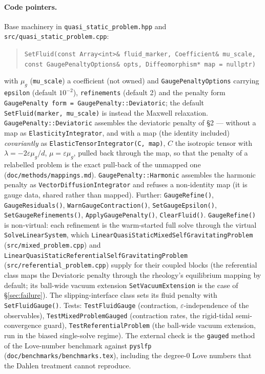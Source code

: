 \documentclass[11pt]{article}
\newcommand{\eps}{\varepsilon}
\begin{document}
\paragraph{Code pointers.}
Base machinery in \texttt{quasi\_static\_problem.hpp} and
\texttt{src/quasi\_static\_problem.cpp}:
\begin{quote}\small\raggedright
\texttt{SetFluid(const Array<int>\& fluid\_marker,
Coefficient\& mu\_scale, const GaugePenaltyOptions\& opts,
Diffeomorphism* map = nullptr)}
\end{quote}
with $\mu_g$ (\texttt{mu\_scale}) a coefficient (not owned) and
\texttt{GaugePenaltyOptions} carrying \texttt{epsilon} (default
$10^{-2}$), \texttt{refinements} (default 2) and the penalty form
\texttt{GaugePenalty form = GaugePenalty::Deviatoric}; the default
\texttt{SetFluid(marker, mu\_scale)} is instead the Maxwell relaxation. \texttt{GaugePenalty::Deviatoric}
assembles the deviatoric penalty of \S2 --- without a map as
\texttt{ElasticityIntegrator}, and with a map (the identity included)
\emph{covariantly} as \texttt{ElasticTensorIntegrator(C, map)}, $C$ the
isotropic tensor with $\lambda = -2\eps\mu_g/d$, $\mu = \eps\mu_g$, pulled
back through the map, so that the penalty of a relabelled problem is the
exact pull-back of the unmapped one (\texttt{doc/methods/mappings.md}).
\texttt{GaugePenalty::Harmonic} assembles the harmonic penalty as
\texttt{VectorDiffusionIntegrator} and refuses a non-identity map (it is
gauge data, shared rather than mapped). Further:
\texttt{GaugeRefine()}, \texttt{GaugeResiduals()},
\texttt{WarnGaugeContraction()}, \texttt{SetGaugeEpsilon()},
\texttt{SetGaugeRefinements()}, \texttt{ApplyGaugePenalty()},
\texttt{ClearFluid()}. \texttt{GaugeRefine()} is non-virtual: each
refinement is the warm-started full solve through the virtual
\texttt{SolveLinearSystem}, which
\texttt{LinearQuasiStaticMixedSelfGravitatingProblem}
(\texttt{src/mixed\_problem.cpp}) and
\texttt{LinearQuasiStaticReferentialSelfGravitatingProblem}
(\texttt{src/referential\_problem.cpp}) supply for their coupled blocks
(the referential class maps the Deviatoric penalty through the
rheology's equilibrium mapping by default; its ball-wide vacuum
extension \texttt{SetVacuumExtension} is the case of
\S\ref{sec:failure}). The slipping-interface class sets its
fluid penalty with \texttt{SetFluidGauge()}.
Tests: \texttt{TestFluidGauge} (contraction, $\eps$-independence of the
observables), \texttt{TestMixedProblemGauged} (contraction rates, the
rigid-tidal semi-convergence guard), \texttt{TestReferentialProblem}
(the ball-wide vacuum extension, run in the biased single-solve regime).
The external check is the \texttt{gauged} method of the Love-number
benchmark against \texttt{pyslfp} (\texttt{doc/benchmarks/benchmarks.tex}),
including the degree-0 Love numbers that the Dahlen treatment cannot
reproduce.
\end{document}
